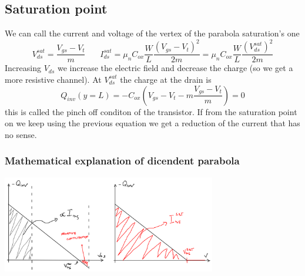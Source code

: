 \vspace{3mm}
\centering
{}
\raggedright
\vspace{3mm}





\subsection{Saturation point}
We can call the current and voltage of the vertex of the parabola saturation's one 
\begin{equation}
V_{ds}^{sat}=\frac{V_{gs}-V_t}{m}\ \ \ \ \ \ \ \ I_{ds}^{sat}=\mu_nC_{ox}\frac{W}{L}\frac{(V_{gs}-V_t)^2}{2m}=\mu_nC_{ox}\frac{W}{L}\frac{(V_{ds}^{sat})^2}{2m}
\end{equation}
Increasing $V_{ds}$ we increase the electric field and decrease the charge (so we get a more resistive channel). At $V_{ds}^{sat}$ the charge at the drain is 
\begin{equation}
Q_{inv}(y=L)=-C_{ox}(V_{gs}-V_t-m \frac{V_{gs}-V_t}{m})=0
\end{equation}
this is called the pinch off conditon of the transistor. If from the saturation point on we keep using the previous equation we get a reduction of the current that has no sense.\\

\subsubsection{Mathematical explanation of dicendent parabola}

\centering
\includegraphics[width=0.7\textwidth]{mathexpl.png}\\
\raggedright

